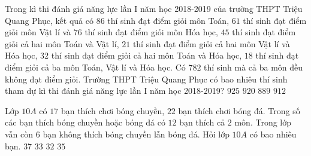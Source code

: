 \begin{ex}%
	Trong kì thi đánh giá năng lực lần I năm học 2018-2019 của trường THPT Triệu Quang Phục, kết quả có $86$ thí sinh đạt điểm giỏi môn Toán, $61$ thí sinh đạt điểm giỏi môn Vật lí và $76$ thí sinh đạt điểm giỏi môn Hóa học, $45$ thí sinh đạt điểm giỏi cả hai môn Toán và Vật lí, $21$ thí sinh đạt điểm giỏi cả hai môn Vật lí và Hóa học, $32$ thí sinh đạt điểm giỏi cả hai môn Toán và Hóa học, $18$ thí sinh đạt điểm giỏi cả ba môn Toán, Vật lí và Hóa học. Có $782$ thí sinh  mà cả ba môn đều không đạt điểm giỏi. Trường THPT Triệu Quang Phục có bao nhiêu thí sinh tham dự kì thi đánh giá năng lực lần I năm học 2018-2019?
	\choice 
		 {\True $925$}
		{$920$} 
		{$889$} 
		{$912$} 
\end{ex}

\begin{ex}%
	Lớp $10A$ có $17$ bạn thích chơi bóng chuyền, $22$ bạn thích chơi bóng đá. Trong số các bạn thích bóng chuyền hoặc bóng đá có $12$ bạn thích cả $2$ môn. Trong lớp vẫn còn $6$ bạn không thích bóng chuyền lẫn bóng đá. Hỏi lớp $10A$ có  bao nhiêu bạn.
	 \choice
		 {$37$}
		{\True  $33$}
		{$32$} 
		 {$35$}
\end{ex}

